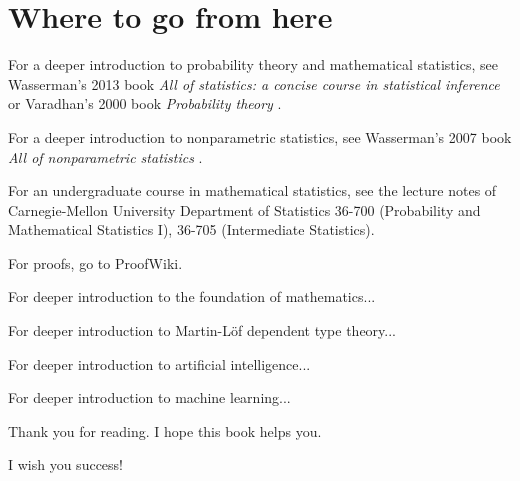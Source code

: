 \chapter{Where to go from here}

For a deeper introduction to probability theory and mathematical statistics,
see Wasserman's 2013 book \emph{All of statistics: a concise course in statistical inference} \cite{wasserman2013all}
or Varadhan's 2000 book \emph{Probability theory} \cite{VaradhanProb}.

For a deeper introduction to nonparametric statistics,
see Wasserman's 2007 book \emph{All of nonparametric statistics} \cite{Wasserman2007Nonparam}.

For an undergraduate course in mathematical statistics,
see the lecture notes of Carnegie-Mellon University
Department of Statistics
36-700 (Probability and Mathematical Statistics I),
36-705 (Intermediate Statistics).

For proofs, go to ProofWiki.

For deeper introduction to the foundation of mathematics...

For deeper introduction to Martin-L\"of dependent type theory...

For deeper introduction to artificial intelligence...

For deeper introduction to machine learning...

Thank you for reading.
I hope this book helps you.

I wish you success!
